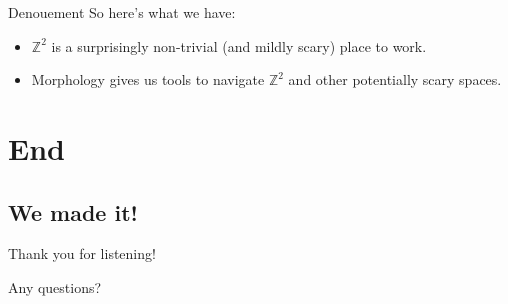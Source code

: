 \documentclass{beamer}
\newcommand{\integers}{\mathbb{Z}}
\begin{document}
\begin{frame}{Denouement}
So here's what we have:
\begin{itemize}
  \item $\integers^2$ is a surprisingly non-trivial (and mildly scary)
        place to work.
  \item Morphology gives us tools to navigate $\integers^2$ and other 
        potentially scary spaces.
\end{itemize}
   
\end{frame}

\section{End}
\subsection{We made it!}
\begin{frame}{Thank you for listening!}

Any questions?
\end{frame}
\end{document}
